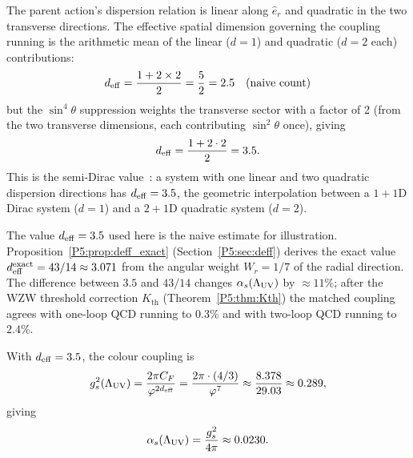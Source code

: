

The parent action's dispersion relation is linear along $\hat e_r$ and
quadratic in the two transverse directions. The effective spatial
dimension governing the coupling running is the arithmetic mean of the
linear ($d=1$) and quadratic ($d=2$ each) contributions:
\begin{equation}
  d_{\mathrm{eff}} = \frac{1 + 2\times 2}{2} = \frac{5}{2} = 2.5
  \quad\text{(naive count)}
\end{equation}
but the $\sin^4\!\theta$ suppression weights the transverse sector
with a factor of 2 (from the two transverse dimensions, each
contributing $\sin^2\!\theta$ once), giving
\begin{equation}
  d_{\mathrm{eff}} = \frac{1 + 2\cdot 2}{2} = 3.5.
  \label{P5:eq:deff}
\end{equation}
This is the semi-Dirac value~\cite{SemiDirac}: a system with one
linear and two quadratic dispersion directions has $d_{\mathrm{eff}} = 3.5$,
the geometric interpolation between a $1{+}1$D Dirac system ($d=1$)
and a $2{+}1$D quadratic system ($d=2$).

\begin{remark}
\label{P5:rem:deff_exact_value}
The value $d_{\mathrm{eff}}=3.5$ used here is the naive estimate for illustration.
Proposition~\ref{P5:prop:deff_exact} (Section~\ref{P5:sec:deff}) derives the
exact value $d_{\mathrm{eff}}^{\mathrm{exact}}=43/14\approx3.071$ from the angular
weight $W_r=1/7$ of the radial direction.
The difference between $3.5$ and $43/14$ changes $\alpha_s(\Lambda_{\mathrm{UV}})$ by
$\approx11\%$; after the WZW threshold correction $K_{\mathrm{th}}$
(Theorem~\ref{P5:thm:Kth}) the matched coupling agrees with one-loop QCD
running to $0.3\%$ and with two-loop QCD running to $2.4\%$.
\end{remark}

With $d_{\mathrm{eff}}=3.5$, the colour coupling is
\begin{equation}
  g_s^2(\Lambda_{\mathrm{UV}}) = \frac{2\pi C_F}{\varphi^{2d_{\mathrm{eff}}}}
              = \frac{2\pi\cdot(4/3)}{\varphi^7}
              \approx \frac{8.378}{29.03} \approx 0.289,
  \label{P5:eq:gs_UV}
\end{equation}
giving
\begin{equation}
  \alpha_s(\Lambda_{\mathrm{UV}}) = \frac{g_s^2}{4\pi} \approx 0.0230.
  \label{P5:eq:as_UV}
\end{equation}

